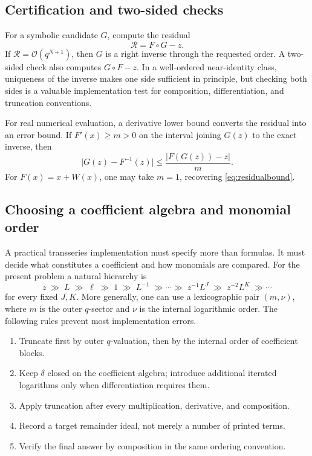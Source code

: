 \documentclass[11pt]{article}
\theoremstyle{clean}
\newcommand{\bigO}{\mathcal O}
\begin{document}
\subsection{Certification and two-sided checks}

For a symbolic candidate \(G\), compute the residual
\begin{equation}\label{eq:formalresidual}
  \mathcal R=F\circ G-z.
\end{equation}
If \(\mathcal R=\bigO(q^{N+1})\), then \(G\) is a right inverse through the
requested order.  A two-sided check also computes \(G\circ F-z\).  In a
well-ordered near-identity class, uniqueness of the inverse makes one side
sufficient in principle, but checking both sides is a valuable implementation
test for composition, differentiation, and truncation conventions.

For real numerical evaluation, a derivative lower bound converts the residual
into an error bound.  If \(F'(x)\ge m>0\) on the interval joining
\(G(z)\) to the exact inverse, then
\begin{equation}\label{eq:generalresidualbound}
  \bigl|G(z)-F^{-1}(z)\bigr|
  \le \frac{|F(G(z))-z|}{m}.
\end{equation}
For \(F(x)=x+W(x)\), one may take \(m=1\), recovering
\cref{eq:residualbound}.

\subsection{Choosing a coefficient algebra and monomial order}

A practical transseries implementation must specify more than formulas.  It
must decide what constitutes a coefficient and how monomials are compared.
For the present problem a natural hierarchy is
\begin{equation}\label{eq:monomialhierarchy}
  z\;\gg\;L\;\gg\;\ell\;\gg\;1\;\gg\;L^{-1}\;\gg\cdots
  \gg\;z^{-1}L^J\;\gg\;z^{-2}L^K\;\gg\cdots
\end{equation}
for every fixed \(J,K\).  More generally, one can use a lexicographic pair
\((m,\nu)\), where \(m\) is the outer \(q\)-sector and \(\nu\) is the
internal logarithmic order.  The following rules prevent most implementation
errors.

\begin{enumerate}[label=\textbf{R\arabic*.},leftmargin=2.5em]
\item Truncate first by outer \(q\)-valuation, then by the internal order of
coefficient blocks.
\item Keep \(\delta\) closed on the coefficient algebra; introduce additional
iterated logarithms only when differentiation requires them.
\item Apply truncation after every multiplication, derivative, and composition.
\item Record a target remainder ideal, not merely a number of printed terms.
\item Verify the final answer by composition in the same ordering convention.
\end{enumerate}
\end{document}
